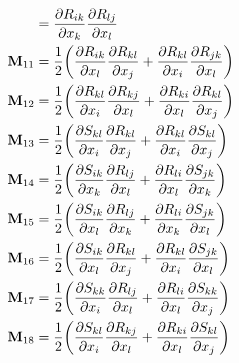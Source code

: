 \begin{subequations}
\begin{align}
	&= \frac{\partial R_{ik}}{\partial x_k}
	   \frac{\partial R_{lj}}{\partial x_l} \\
	\mathmakebox[\widthof{$\mathbf{M}_{10}$}][l]{\mathbf{M}_{11}}
	&= \frac{1}{2} 
			  \bigg( \frac{\partial R_{ik}}{\partial x_l}
					 \frac{\partial R_{kl}}{\partial x_j} 
				  	+ 
					 \frac{\partial R_{kl}}{\partial x_i} 
					 \frac{\partial R_{jk}}{\partial x_l} \bigg) \\
	\mathmakebox[\widthof{$\mathbf{M}_{10}$}][l]{\mathbf{M}_{12}}
	&= \frac{1}{2} 
			  \bigg( \frac{\partial R_{kl}}{\partial x_i}
					 \frac{\partial R_{kj}}{\partial x_l} 
				  	+ 
					 \frac{\partial R_{ki}}{\partial x_l} 
					 \frac{\partial R_{kl}}{\partial x_j} \bigg)  \\
	\mathmakebox[\widthof{$\mathbf{M}_{10}$}][l]{\mathbf{M}_{13}}
	&= \frac{1}{2} 
			  \bigg( \frac{\partial S_{kl}}{\partial x_i}
					 \frac{\partial R_{kl}}{\partial x_j} 
				  	+ 
					 \frac{\partial R_{kl}}{\partial x_i}
					 \frac{\partial S_{kl}}{\partial x_j}  \bigg)  \\
	\mathmakebox[\widthof{$\mathbf{M}_{10}$}][l]{\mathbf{M}_{14}}
	&= \frac{1}{2} 
			  \bigg( \frac{\partial S_{ik}}{\partial x_k}
					 \frac{\partial R_{lj}}{\partial x_l} 
				  	+ 
					 \frac{\partial R_{li}}{\partial x_l} 
					 \frac{\partial S_{jk}}{\partial x_k} \bigg)  \\
	\mathmakebox[\widthof{$\mathbf{M}_{10}$}][l]{\mathbf{M}_{15}}
	&= \frac{1}{2} 
			  \bigg( \frac{\partial S_{ik}}{\partial x_l}
					 \frac{\partial R_{lj}}{\partial x_k} 
				  	+ 
					 \frac{\partial R_{li}}{\partial x_k} 
					 \frac{\partial S_{jk}}{\partial x_l} \bigg)  \\
	\mathmakebox[\widthof{$\mathbf{M}_{10}$}][l]{\mathbf{M}_{16}}
	&= \frac{1}{2} 
			  \bigg( \frac{\partial S_{ik}}{\partial x_l}
					 \frac{\partial R_{kl}}{\partial x_j} 
				  	+ 
					 \frac{\partial R_{kl}}{\partial x_i} 
					 \frac{\partial S_{jk}}{\partial x_l} \bigg)  \\
	\mathmakebox[\widthof{$\mathbf{M}_{10}$}][l]{\mathbf{M}_{17}}
	&= \frac{1}{2} 
			  \bigg( \frac{\partial S_{kk}}{\partial x_i}
					 \frac{\partial R_{lj}}{\partial x_l} 
				  	+ 
					 \frac{\partial R_{li}}{\partial x_l} 
					 \frac{\partial S_{kk}}{\partial x_j} \bigg)  \\
	\mathmakebox[\widthof{$\mathbf{M}_{10}$}][l]{\mathbf{M}_{18}}
	&= \frac{1}{2} 
			  \bigg( \frac{\partial S_{kl}}{\partial x_i}
					 \frac{\partial R_{kj}}{\partial x_l} 
				  	+ 
					 \frac{\partial R_{ki}}{\partial x_l} 
					 \frac{\partial S_{kl}}{\partial x_j} \bigg)
\end{align}
\end{subequations}
%
%    

